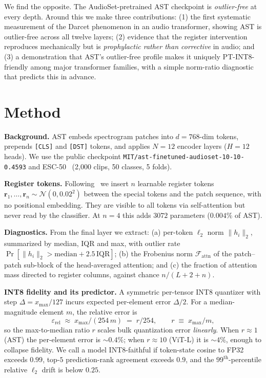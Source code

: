 \documentclass{Interspeech2024}
\begin{document}
We find the opposite. The AudioSet-pretrained AST checkpoint is \emph{outlier-free} at every depth. Around this we make three contributions: (1) the first systematic measurement of the Darcet phenomenon in an audio transformer, showing AST is outlier-free across all twelve layers; (2) evidence that the register intervention reproduces mechanically but is \emph{prophylactic rather than corrective} in audio; and (3) a demonstration that AST's outlier-free profile makes it uniquely PT-INT8-friendly among major transformer families, with a simple norm-ratio diagnostic that predicts this in advance.

\section{Method}
\textbf{Background.} AST embeds spectrogram patches into $d{=}768$-dim tokens, prepends \texttt{[CLS]} and \texttt{[DST]} tokens, and applies $N{=}12$ encoder layers ($H{=}12$ heads). We use the public checkpoint \texttt{MIT/ast-finetuned-audioset-10-10-0.4593} and ESC-50~\cite{piczak2015esc} (2{,}000 clips, 50 classes, 5 folds).

\textbf{Register tokens.} Following~\cite{darcet2024need} we insert $n$ learnable register tokens $\mathbf{r}_1,\ldots,\mathbf{r}_n\sim\mathcal{N}(0,0.02^2)$ between the special tokens and the patch sequence, with no positional embedding. They are visible to all tokens via self-attention but never read by the classifier. At $n{=}4$ this adds $3072$ parameters ($0.004\%$ of AST).

\textbf{Diagnostics.} From the final layer we extract: (a) per-token $\ell_2$ norm $\lVert h_i\rVert_2$, summarized by median, IQR and max, with outlier rate $\Pr[\lVert h_i\rVert_2 > \mathrm{median}+2.5\,\mathrm{IQR}]$; (b) the Frobenius norm $\mathcal{F}_{\text{attn}}$ of the patch--patch sub-block of the head-averaged attention; and (c) the fraction of attention mass directed to register columns, against chance $n/(L{+}2{+}n)$.

\textbf{INT8 fidelity and its predictor.} A symmetric per-tensor INT8 quantizer with step $\Delta = x_{\mathrm{max}}/127$ incurs expected per-element error $\Delta/2$. For a median-magnitude element $m$, the relative error is
\begin{equation}
\varepsilon_{\mathrm{rel}} \;\approx\; x_{\mathrm{max}} / (254\,m) \;=\; r/254,
\qquad r \;\equiv\; x_{\mathrm{max}}/m ,
\label{eq:r}
\end{equation}
so the max-to-median ratio $r$ scales bulk quantization error \emph{linearly}. When $r\!\approx\!1$ (AST) the per-element error is $\sim\!0.4\%$; when $r\!\approx\!10$ (ViT-L) it is $\sim\!4\%$, enough to collapse fidelity. We call a model INT8-faithful if token-state cosine to FP32 exceeds $0.99$, top-$5$ prediction-rank agreement exceeds $0.9$, and the $99^{\text{th}}$-percentile relative $\ell_2$ drift is below $0.25$.
\end{document}
